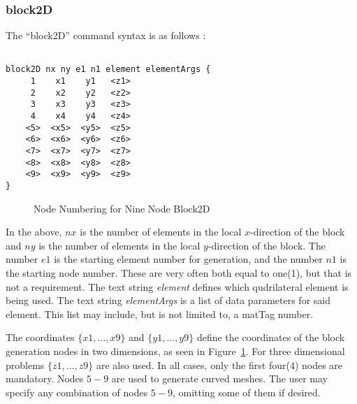 \documentclass[12pt]{article}
\begin{document}
\subsubsection{block2D}
The ``block2D'' command syntax is as follows :
{\sf\small
\begin{verbatim}

block2D nx ny e1 n1 element elementArgs {
     1    x1    y1   <z1>
     2    x2    y2   <z2>
     3    x3    y3   <z3>
     4    x4    y4   <z4>
    <5>  <x5>  <y5>  <z5>
    <6>  <x6>  <y6>  <z6>
    <7>  <x7>  <y7>  <z7>
    <8>  <x8>  <y8>  <z8>
    <9>  <x9>  <y9>  <z9>
}
\end{verbatim}

\begin{figure}[htpb]
\begin{center}
\epsfysize=2.0in
\end{center}
\caption{Node Numbering for Nine Node Block2D}
\label{blocknodenumbering}
\end{figure}
}

In the above, $nx$ is the number of elements in the local $x$-direction of
the block and $ny$ is the number of elements in the local $y$-direction of
the block.  The number $e1$ is the starting element number for generation, and 
the number $n1$ is the starting node number.  These are very often both equal to 
one(1), but that is not a requirement.  The text string {\em element} defines 
which qudrilateral element is being used.  The text string {\em elementArgs}
is a list of data parameters for said element.  This list may include, but is
not limited to, a matTag number.

The coordinates $\{x1,...,x9\}$ and $\{y1,...,y9\}$ define the coordinates
of the block generation nodes in two dimensions, as seen in Figure~\ref{blocknodenumbering}.
For three dimensional 
problems $\{z1,...,z9\}$ are also used.  In all cases, only the first four(4) 
nodes are mandatory. Nodes $5-9$ are used to generate curved meshes.
The user may specify any combination of nodes $5-9$, omitting some of them
if desired.
\end{document}
